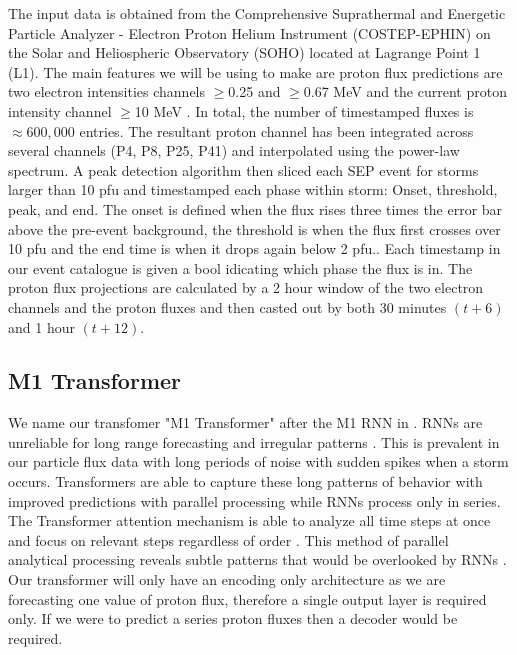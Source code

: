 The input data  is obtained from the Comprehensive Suprathermal and Energetic Particle Analyzer - Electron Proton Helium Instrument (COSTEP-EPHIN)  on the Solar and Heliospheric Observatory (SOHO) located at Lagrange Point 1 (L1). The main features we will be using to make are proton flux predictions are two electron intensities channels $\geq$0.25 and $\geq$0.67 MeV and the current proton intensity channel $\geq$10 MeV \cite{mullermellin1995costep}. In total, the number of timestamped fluxes is $\approx 600,000$ entries. The resultant proton channel has been integrated across several channels (P4, P8, P25, P41) and interpolated using the power-law spectrum. A peak detection algorithm then sliced each SEP event for storms larger than 10 pfu and timestamped each phase within storm: Onset, threshold, peak, and end. The onset is defined when the flux rises three times the error bar above the pre-event background, the threshold is when the flux first crosses over 10 pfu and the end time is when it drops again below 2 pfu.\cite{torres2025machine}. Each timestamp in our event catalogue is given a bool idicating which phase the flux is in. The proton flux projections are calculated by a 2 hour window of the two electron channels and the proton fluxes and then casted out by both 30 minutes $(t+6)$ and 1 hour $(t+12)$.

\subsection{M1 Transformer}
\label{sec:m1transformer}
We name our transfomer "M1 Transformer" after the M1 RNN in \cite{torres2025machine}. RNNs are unreliable for long range forecasting and irregular patterns \cite{zhao2026transformersurvey}. This is prevalent in our particle flux data with long periods of noise with sudden spikes when a storm occurs. Transformers are able to capture these long patterns of behavior with improved predictions with parallel processing while RNNs process only in series. The Transformer attention mechanism is able to analyze all time steps at once and focus on relevant steps regardless of order \cite{vaswani2017attention}.  This method of parallel analytical processing reveals subtle patterns that would be overlooked by RNNs \cite{zhao2026transformersurvey}. Our transformer will only have an encoding only architecture as we are forecasting one value of proton flux, therefore a single output layer is required only. If we were to predict a series proton fluxes then a decoder would be required.

